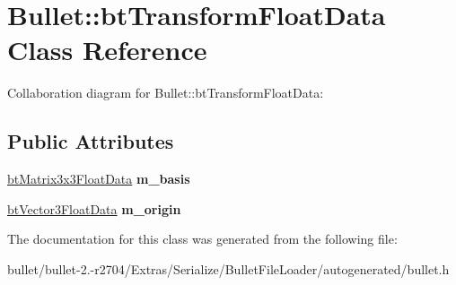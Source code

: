 \hypertarget{class_bullet_1_1bt_transform_float_data}{\section{Bullet\+:\+:bt\+Transform\+Float\+Data Class Reference}
\label{class_bullet_1_1bt_transform_float_data}
}


Collaboration diagram for Bullet\+:\+:bt\+Transform\+Float\+Data\+:
\subsection*{Public Attributes}
\begin{DoxyCompactItemize}
\item 
\hypertarget{class_bullet_1_1bt_transform_float_data_a8c0c0c12ab174ea04162d1bb1adb6082}{\hyperlink{class_bullet_1_1bt_matrix3x3_float_data}{bt\+Matrix3x3\+Float\+Data} {\bfseries m\+\_\+basis}}\label{class_bullet_1_1bt_transform_float_data_a8c0c0c12ab174ea04162d1bb1adb6082}

\item 
\hypertarget{class_bullet_1_1bt_transform_float_data_ad36b0cbe67313ed3519707b1a3ab5153}{\hyperlink{class_bullet_1_1bt_vector3_float_data}{bt\+Vector3\+Float\+Data} {\bfseries m\+\_\+origin}}\label{class_bullet_1_1bt_transform_float_data_ad36b0cbe67313ed3519707b1a3ab5153}

\end{DoxyCompactItemize}


The documentation for this class was generated from the following file\+:\begin{DoxyCompactItemize}
\item 
bullet/bullet-\/2.-\/r2704/\+Extras/\+Serialize/\+Bullet\+File\+Loader/autogenerated/bullet.\+h\end{DoxyCompactItemize}
